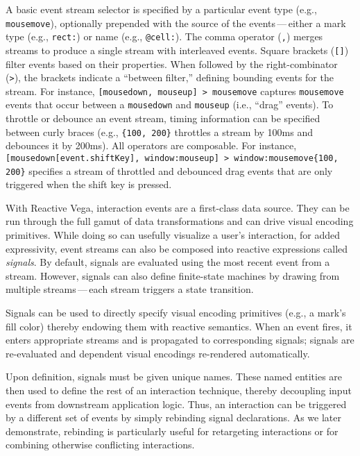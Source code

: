 A basic event stream selector is specified by a particular event type (e.g.,
\texttt{mousemove}), optionally prepended with the source of the
events\,---\,either a mark type (e.g., \texttt{rect:}) or name (e.g.,
\texttt{@cell:}). The comma operator (\texttt{,}) merges streams to produce a
single stream with interleaved events. Square brackets (\texttt{[]}) filter
events based on their properties. When followed by the right-combinator
(\texttt{>}), the brackets indicate a ``between filter,'' defining bounding
events for the stream. For instance, \texttt{[mousedown, mouseup] > mousemove}
captures \texttt{mousemove} events that occur between a \texttt{mousedown} and
\texttt{mouseup} (i.e., ``drag'' events). To throttle or debounce an event
stream, timing information can be specified between curly braces (e.g.,
\texttt{\{100, 200\}} throttles a stream by 100ms and debounces it by 200ms).
All operators are composable. For instance, \texttt{[mousedown[event.shiftKey],
window:mouseup] > window:mousemove\{100, 200\}} specifies a stream of throttled
and debounced drag events that are only triggered when the shift key is pressed.

With Reactive Vega, interaction events are a first-class data source. They can
be run through the full gamut of data transformations and can drive visual
encoding primitives. While doing so can usefully visualize a user's interaction,
for added expressivity, event streams can also be composed into reactive
expressions called \emph{signals}. By default, signals are evaluated using the
most recent event from a stream. However, signals can also define finite-state
machines by drawing from multiple streams\,---\,each stream triggers a state
transition.

Signals can be used to directly specify visual encoding primitives (e.g., a
mark's fill color) thereby endowing them with reactive semantics. When an event
fires, it enters appropriate streams and is propagated to corresponding signals;
signals are re-evaluated and dependent visual encodings re-rendered
automatically.

Upon definition, signals must be given unique names. These named entities are
then used to define the rest of an interaction technique, thereby decoupling
input events from downstream application logic. Thus, an interaction can be
triggered by a different set of events by simply rebinding signal declarations.
As we later demonstrate, rebinding is particularly useful for retargeting
interactions or for combining otherwise conflicting interactions.

